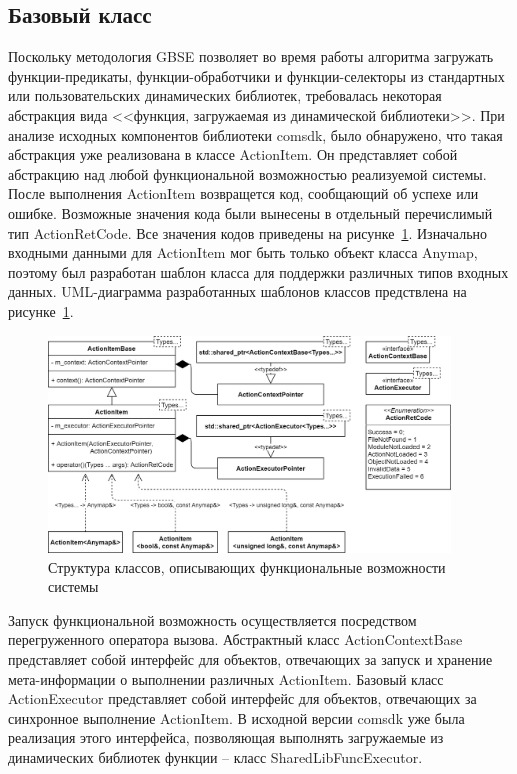 \subsection{Базовый класс}
Поскольку методология GBSE позволяет во время работы алгоритма загружать функции-предикаты, функции-обработчики и функции-селекторы из стандартных или пользовательских динамических библиотек, требовалась некоторая абстракция вида <<функция, загружаемая из динамической библиотеки>>. При анализе исходных компонентов библиотеки comsdk, было обнаружено, что такая абстракция уже реализована в классе \textsf{ActionItem}. Он представляет собой абстракцию над любой функциональной возможностью реализуемой системы. После выполнения \textsf{ActionItem} возвращется код, сообщающий об успехе или ошибке. Возможные значения кода были вынесены в отдельный перечислимый тип \textsf{ActionRetCode}. Все значения кодов приведены на рисунке~\ref{fig:UMLActionItems}. Изначально входными данными для \textsf{ActionItem} мог быть только объект класса \textsf{Anymap}, поэтому был разработан шаблон класса для поддержки различных типов входных данных. UML-диаграмма разработанных шаблонов классов предствлена на рисунке~\ref{fig:UMLActionItems}.
\begin{figure}[!ht]
    \centering
    \includegraphics[width=0.95\textwidth]{figures/UML.actionItem.png}
    \caption{Структура классов, описывающих функциональные возможности системы}
    \label{fig:UMLActionItems}
\end{figure}

Запуск функциональной возможность осуществляется посредством перегруженного оператора вызова. Абстрактный класс \textsf{ActionContextBase} представляет собой интерфейс для объектов, отвечающих за запуск и хранение мета-информации о выполнении различных \textsf{ActionItem}. Базовый класс \textsf{ActionExecutor} представляет собой интерфейс для объектов, отвечающих за синхронное выполнение \textsf{ActionItem}. В исходной версии comsdk уже была реализация этого интерфейса, позволяющая выполнять загружаемые из динамических библиотек функции -- класс \textsf{SharedLibFuncExecutor}.

